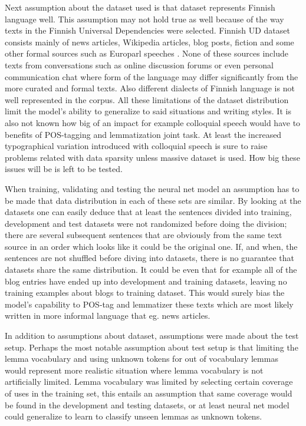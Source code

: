 \documentclass[12pt,a4paper,english
]{tutthesis}
\begin{document}
Next assumption about the dataset used is that dataset represents Finnish language well. This assumption may not hold true as well because of the way texts in the Finnish Universal Dependencies were selected. Finnish UD dataset consists mainly of news articles, Wikipedia articles, blog posts, fiction and some other formal sources such as Europarl speeches \cite{Haverinen2014}. None of these sources include texts from conversations such as online discussion forums or even personal communication chat where form of the language may differ significantly from the more curated and formal texts. Also different dialects of Finnish language is not well represented in the corpus. All these limitations of the dataset distribution limit the model's ability to generalize to said situations and writing styles. It is also not known how big of an impact for example colloquial speech would have to benefits of POS-tagging and lemmatization joint task. At least the increased typographical variation introduced with colloquial speech is sure to raise problems related with data sparsity unless massive dataset is used. How big these issues will be is left to be tested.

When training, validating and testing the neural net model an assumption has to be made that data distribution in each of these sets are similar. By looking at the datasets one can easily deduce that at least the sentences divided into training, development and test datasets were not randomized before doing the division; there are several subsequent sentences that are obviously from the same text source in an order which looks like it could be the original one. If, and when, the sentences are not shuffled before diving into datasets, there is no guarantee that datasets share the same distribution. It could be even that for example all of the blog entries have ended up into development and training datasets, leaving no training examples about blogs to training dataset. This would surely bias the model's capability to POS-tag and lemmatizer these texts which are most likely written in more informal language that eg. news articles.

In addition to assumptions about dataset, assumptions were made about the test setup. Perhaps the most notable assumption about test setup is that limiting the lemma vocabulary and using unknown tokens for out of vocabulary lemmas would represent more realistic situation where lemma vocabulary is not artificially limited. Lemma vocabulary was limited by selecting certain coverage of uses in the training set, this entails an assumption that same coverage would be found in the development and testing datasets, or at least neural net model could generalize to learn to classify unseen lemmas as unknown tokens.
\end{document}
